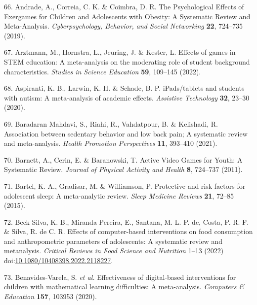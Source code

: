 \documentclass[
  english,
  man]{apa6}
\newenvironment{cslreferences}%
  {}%
  {\par}
\begin{document}
\begin{cslreferences}
\leavevmode\hypertarget{ref-andradePsychologicalEffectsExergames2019}{}%
66. Andrade, A., Correia, C. K. \& Coimbra, D. R. The Psychological Effects of Exergames for Children and Adolescents with Obesity: A Systematic Review and Meta-Analysis. \emph{Cyberpsychology, Behavior, and Social Networking} \textbf{22}, 724--735 (2019).

\leavevmode\hypertarget{ref-arztmannEffectsGamesSTEM2022}{}%
67. Arztmann, M., Hornstra, L., Jeuring, J. \& Kester, L. Effects of games in STEM education: A meta-analysis on the moderating role of student background characteristics. \emph{Studies in Science Education} \textbf{59}, 109--145 (2022).

\leavevmode\hypertarget{ref-aspirantiIPadsTabletsStudents2020}{}%
68. Aspiranti, K. B., Larwin, K. H. \& Schade, B. P. iPads/tablets and students with autism: A meta-analysis of academic effects. \emph{Assistive Technology} \textbf{32}, 23--30 (2020).

\leavevmode\hypertarget{ref-baradaranmahdaviAssociationSedentaryBehavior2021}{}%
69. Baradaran Mahdavi, S., Riahi, R., Vahdatpour, B. \& Kelishadi, R. Association between sedentary behavior and low back pain; A systematic review and meta-analysis. \emph{Health Promotion Perspectives} \textbf{11}, 393--410 (2021).

\leavevmode\hypertarget{ref-barnettActiveVideoGames2011}{}%
70. Barnett, A., Cerin, E. \& Baranowski, T. Active Video Games for Youth: A Systematic Review. \emph{Journal of Physical Activity and Health} \textbf{8}, 724--737 (2011).

\leavevmode\hypertarget{ref-bartelProtectiveRiskFactors2015}{}%
71. Bartel, K. A., Gradisar, M. \& Williamson, P. Protective and risk factors for adolescent sleep: A meta-analytic review. \emph{Sleep Medicine Reviews} \textbf{21}, 72--85 (2015).

\leavevmode\hypertarget{ref-becksilvaEffectsComputerbasedInterventions2022}{}%
72. Beck Silva, K. B., Miranda Pereira, E., Santana, M. L. P. de, Costa, P. R. F. \& Silva, R. de C. R. Effects of computer-based interventions on food consumption and anthropometric parameters of adolescents: A systematic review and metanalysis. \emph{Critical Reviews in Food Science and Nutrition} 1--13 (2022) doi:\href{https://doi.org/10.1080/10408398.2022.2118227}{10.1080/10408398.2022.2118227}.

\leavevmode\hypertarget{ref-benavides-varelaEffectivenessDigitalbasedInterventions2020}{}%
73. Benavides-Varela, S. \emph{et al.} Effectiveness of digital-based interventions for children with mathematical learning difficulties: A meta-analysis. \emph{Computers \& Education} \textbf{157}, 103953 (2020).


\end{cslreferences}
\end{document}
